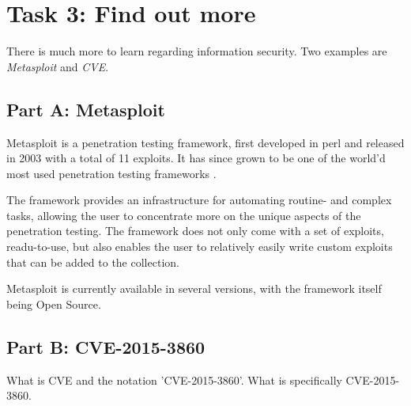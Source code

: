 \section{Task 3: Find out more}
There is much more to learn regarding information security. Two examples
are \textit{Metasploit} and \textit{CVE}.

\subsection{Part A: Metasploit}
Metasploit is a penetration testing framework, first developed in perl and
released in 2003 with a total of 11 exploits\cite{NOSTARCHMETASPLOIT}. It has
since grown to be one of the world'd most used penetration testing frameworks
\cite{METASPLHOME}.

The framework provides an infrastructure for automating routine- and complex
tasks, allowing the user to concentrate more on the unique aspects of the
penetration testing. The framework does not only come with a set of exploits,
readu-to-use, but also enables the user to relatively easily write custom
exploits that can be added to the collection.

Metasploit is currently available in several versions, with the framework
itself being Open Source.\cite{METASPLEDIT}

\subsection{Part B: CVE-2015-3860}
What is CVE and the notation 'CVE-2015-3860'.
What is specifically CVE-2015-3860.
